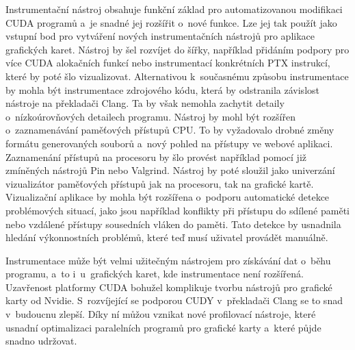 Instrumentační nástroj obsahuje funkční základ pro automatizovanou modifikaci CUDA programů a~je snadné jej rozšířit o~nové funkce. Lze jej tak použít jako vstupní bod pro vytváření nových instrumentačních nástrojů pro aplikace grafických karet. Nástroj by šel rozvíjet do šířky, například přidáním podpory pro více CUDA alokačních funkcí nebo instrumentací konkrétních PTX instrukcí, které by poté šlo vizualizovat. Alternativou k~současnému způsobu instrumentace by mohla být instrumentace zdrojového kódu, která by odstranila závislost nástroje na překladači Clang. Ta by však nemohla zachytit detaily o~nízkoúrovňových detailech programu.
Nástroj by mohl být rozšířen o~zaznamenávání paměťových přístupů CPU. To by vyžadovalo drobné změny formátu generovaných souborů a~nový pohled na přístupy ve webové aplikaci. Zaznamenání přístupů na procesoru by šlo provést například pomocí již zmíněných nástrojů Pin\cite{pin} nebo Valgrind\cite{valgrind}. Nástroj by poté sloužil jako univerzání vizualizátor paměťových přístupů jak na procesoru, tak na grafické kartě. Vizualizační aplikace by mohla být rozšířena o~podporu automatické detekce problémových situací, jako jsou například konflikty při přístupu do sdílené paměti nebo vzdálené přístupy sousedních vláken do paměti. Tato detekce by usnadnila hledání výkonnostních problémů, které teď musí uživatel provádět manuálně.

Instrumentace může být velmi užitečným nástrojem pro získávání dat o~běhu programu, a~to i~u~grafických karet, kde instrumentace není rozšířená. Uzavřenost platformy CUDA bohužel komplikuje tvorbu nástrojů pro grafické karty od Nvidie. S~rozvíjející se podporou CUDY v~překladači Clang se to snad v~budoucnu zlepší. Díky ní můžou vznikat nové profilovací nástroje, které usnadní optimalizaci paralelních programů pro grafické karty a~které půjde snadno udržovat.
